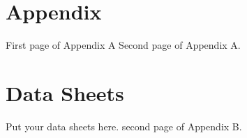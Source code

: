 \begin{appendices}
\chapter{Appendix}%
\vspace{-1cm}
First page of Appendix A
\newpage
Second page of Appendix A.
\newpage
\chapter{Data Sheets}
\noindent Put your data sheets here.
\newpage
second page of Appendix B.
\end{appendices}
\pagebreak